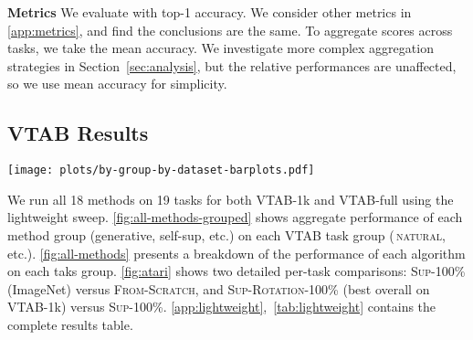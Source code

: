 \documentclass{article}
\newcommand{\myparagraph}[1]{\noindent\textbf{#1}\quad}
\DeclareRobustCommand{\taskNatural}{\raisebox{0.5pt}{\tikz{\fill[natural] (0cm,0cm) circle (.5ex);}}\,\textsc{natural}}
\newcommand{\imagenet}{ImageNet}
\begin{document}
\myparagraph{Metrics}
We evaluate with top-1 accuracy.
We consider other metrics in \cref{app:metrics}, and find the conclusions are the same.
To aggregate scores across tasks, we take the mean accuracy.
We investigate more complex aggregation strategies in Section~\ref{sec:analysis}, but the relative performances are unaffected, so we use mean accuracy for simplicity.


\subsection{VTAB Results}

\begin{SCfigure*}[][t]
  \texttt{[image: plots/by-group-by-dataset-barplots.pdf]}\\
  \vspace{-15pt}
  \caption{
  The methods are divided into five groups:
  Generative,
  training from-scratch,
  all methods using $10\%$ labels (Semi Supervised),
  and all methods using $100\%$ labels (Supervised),
  For each task group, bars show the mean accuracy across all methods with 3 repeats.
  Error bars indicate standard deviation across methods.
  The BigBiGAN outlier causes the high variance in generative models.
  \vspace{-15pt}
  }
  \label{fig:all-methods-grouped}
\end{SCfigure*}


We run all 18 methods on 19 tasks for both VTAB-1k and VTAB-full using the lightweight sweep.
\cref{fig:all-methods-grouped} shows aggregate performance of each method group (generative, self-sup, etc.) on each VTAB task group (\taskNatural{}, etc.).
\cref{fig:all-methods} presents a breakdown of the performance of each algorithm on each taks group.
\cref{fig:atari} shows two detailed per-task comparisons:
\textsc{Sup-100\%} (\imagenet{}) versus \textsc{From-Scratch}, and
\textsc{Sup-Rotation-100\%} (best overall on VTAB-1k) versus \textsc{Sup-100\%}.
\cref{app:lightweight},~\cref{tab:lightweight} contains the complete results table.
\end{document}
